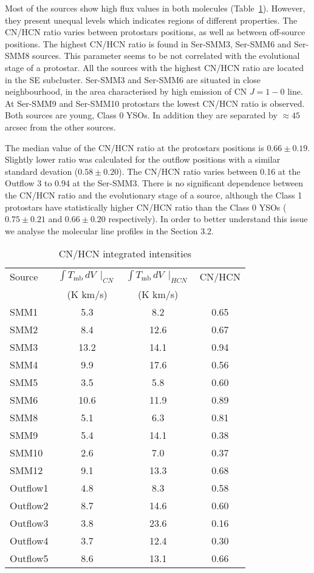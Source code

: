 \documentclass{aa}
\begin{document}
Most of the sources show high flux values in both molecules (Table~\ref{table:CN/HCN}). However, they present unequal levels which indicates regions of different properties. The CN/HCN ratio varies between protostars positions, as well as between off-source positions. The highest CN/HCN ratio is found in Ser-SMM3, Ser-SMM6 and Ser-SMM8 sources. This parameter seems to be not correlated with the evolutional stage of a protostar. All the sources with the highest CN/HCN ratio are located in the SE subcluster. Ser-SMM3 and Ser-SMM6 are situated in close neighbourhood, in the area characterised by high emission of CN $J=1-0$ line. At Ser-SMM9 and Ser-SMM10 protostars the lowest CN/HCN ratio is observed. Both sources are young, Class 0 YSOs. In addition they are separated by $\approx 45$ arcsec from the other sources. 

The median value of the CN/HCN ratio at the protostars positions is $0.66 \pm 0.19$. Slightly lower ratio was calculated for the outflow positions with a similar standard devation ($0.58 \pm 0.20$). The CN/HCN ratio varies between 0.16 at the Outflow 3 to 0.94 at the Ser-SMM3. There is no significant dependence between the CN/HCN ratio and the evolutionary stage of a source, although the Class 1 protostars have statistically higher CN/HCN ratio than the Class 0 YSOs ($0.75 \pm 0.21$ and $0.66 \pm 0.20$ respectively). In order to better understand this issue we analyse the molecular line profiles in the Section 3.2.


\begin{table}
\caption{CN/HCN integrated intensities}             %
\label{table:CN/HCN}      %
\centering                          %
\begin{tabular}{l c c c} 
\hline\hline  
Source & $\int T_\mathrm{mb}\, dV \, \mid_{CN}$ &  $\int T_\mathrm{mb}\, dV \, \mid_{HCN}$ & CN/HCN \\
& (K km/s) & (K km/s) & \\
\hline
SMM1 & 5.3 & 8.2 & 0.65 \\
SMM2 & 8.4 & 12.6 & 0.67 \\
SMM3 & 13.2 & 14.1 & 0.94 \\ 
SMM4 & 9.9 & 17.6 & 0.56\\
SMM5 & 3.5 & 5.8 & 0.60 \\
SMM6 & 10.6 & 11.9 & 0.89 \\ 
SMM8 & 5.1 & 6.3 & 0.81 \\
SMM9 & 5.4 & 14.1 & 0.38 \\
SMM10 & 2.6 & 7.0 & 0.37\\ 
SMM12 & 9.1 & 13.3 & 0.68 \\ \hdashline
Outflow1 & 4.8 & 8.3 & 0.58 \\
Outflow2 & 8.7 & 14.6 & 0.60 \\
Outflow3 & 3.8 & 23.6 & 0.16 \\
Outflow4 & 3.7 & 12.4 & 0.30 \\
Outflow5 & 8.6 & 13.1 & 0.66 \\
\hline
\end{tabular}
\end{table} 
\end{document}
